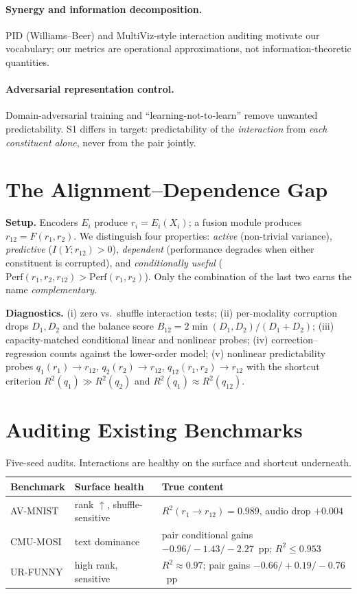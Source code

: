 \documentclass[10pt,twocolumn]{article}
\newcommand{\rIA}{r_{12}}
\newcommand{\ra}{r_1}
\newcommand{\rb}{r_2}
\begin{document}
\paragraph{Synergy and information decomposition.} PID (Williams--Beer) and MultiViz-style
interaction auditing motivate our vocabulary; our metrics are operational approximations, not
information-theoretic quantities.
\paragraph{Adversarial representation control.} Domain-adversarial training and
``learning-not-to-learn'' remove unwanted predictability. S1 differs in target: predictability of
the \emph{interaction} from \emph{each constituent alone}, never from the pair jointly.

\section{The Alignment--Dependence Gap}\label{sec:diagnostics}
\textbf{Setup.} Encoders $E_i$ produce $r_i=E_i(X_i)$; a fusion module produces
$\rIA=F(\ra,\rb)$. We distinguish four properties: \emph{active} (non-trivial variance),
\emph{predictive} ($I(Y;\rIA)>0$), \emph{dependent} (performance degrades when either constituent
is corrupted), and \emph{conditionally useful}
($\mathrm{Perf}(\ra,\rb,\rIA)>\mathrm{Perf}(\ra,\rb)$). Only the combination of the last two
earns the name \emph{complementary}.

\textbf{Diagnostics.} (i) zero vs.\ shuffle interaction tests; (ii) per-modality corruption drops
$D_1, D_2$ and the balance score $B_{12}=2\min(D_1,D_2)/(D_1+D_2)$; (iii) capacity-matched
conditional linear and nonlinear probes; (iv) correction--regression counts against the
lower-order model; (v) nonlinear predictability probes $q_1(\ra)\!\to\!\rIA$,
$q_2(\rb)\!\to\!\rIA$, $q_{12}(\ra,\rb)\!\to\!\rIA$ with the shortcut criterion
$R^2(q_1)\!\gg\!R^2(q_2)$ and $R^2(q_1)\!\approx\!R^2(q_{12})$.

\section{Auditing Existing Benchmarks}\label{sec:audit}
\begin{table}[h]\centering\small
\caption{Five-seed audits. Interactions are healthy on the surface and shortcut underneath.}
\begin{tabular}{lll}
\toprule
Benchmark & Surface health & True content \\
\midrule
AV-MNIST & rank ${\uparrow}$, shuffle-sensitive & $R^2(\ra{\to}\rIA){=}0.989$, audio drop $+0.004$ \\
CMU-MOSI & text dominance & pair conditional gains $-0.96/-1.43/-2.27$~pp; $R^2\!\le\!0.953$ \\
UR-FUNNY & high rank, sensitive & $R^2\!\approx\!0.97$; pair gains $-0.66/{+}0.19/{-}0.76$~pp \\
\bottomrule
\end{tabular}
\end{table}
\end{document}
